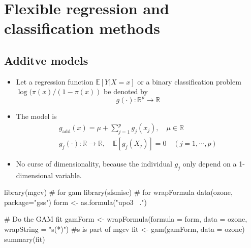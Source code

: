 \section{Flexible regression and classification methods}
\subsection{Additve models}
\begin{theory}
\begin{itemize}
 \item Let a regression function $\mathbb{E}[Y|X = x]$ or a binary classification problem $\log(\pi(x)/(1-\pi(x))$ be denoted by 
 \begin{equation*}
  g(\cdot):\mathbb{R}^p\rightarrow\mathbb{R}
 \end{equation*}
 \item The model is
 \begin{gather*}
  g_{\text{add}}(x) = \mu + \sum_{j=1}^p g_j(x_j), \quad\mu\in\mathbb{R}\\
  g_j(\cdot): \mathbb{R}\rightarrow\mathbb{R},\quad\mathbb{E}[g_j(X_j)] = 0\quad (j=1,\cdots,p)
 \end{gather*}
 \item No curse of dimensionality, because the individual $g_j$ only depend on a 1-dimensional variable.
\end{itemize}
\end{theory}
\begin{code}
 library(mgcv) # for gam
 library(sfsmisc) # for wrapFormula
 data(ozone, package="gss")
 form <- as.formula("upo3 ~.")
 
 # Do the GAM fit
 gamForm <- wrapFormula(formula = form, data = ozone, wrapString = "s(*)") #s is part of mgcv
 fit <- gam(gamForm, data = ozone) 
 summary(fit)
\end{code}
